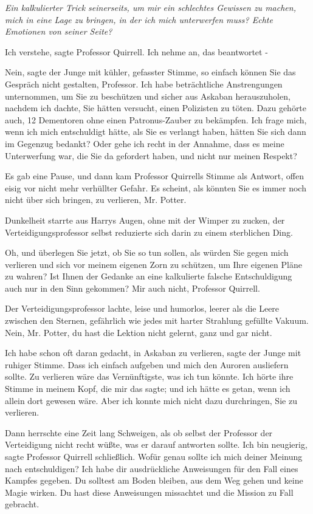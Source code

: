 \emph{Ein kalkulierter Trick seinerseits, um mir ein schlechtes Gewissen zu
machen, mich in eine Lage zu bringen, in der ich mich unterwerfen muss? Echte
Emotionen von seiner Seite?}

\glqq Ich verstehe\grqq{}, sagte Professor Quirrell. \glqq Ich nehme an, das
beantwortet -\grqq{}

\glqq Nein\grqq{}, sagte der Junge mit kühler, gefasster Stimme, \glqq so
einfach können Sie das Gespräch nicht gestalten, Professor. Ich habe
beträchtliche Anstrengungen unternommen, um Sie zu beschützen und sicher aus
Askaban herauszuholen, nachdem ich dachte, Sie hätten versucht, einen Polizisten
zu töten. Dazu gehörte auch, 12 Dementoren ohne einen Patronus-Zauber zu
bekämpfen. Ich frage mich, wenn ich mich entschuldigt hätte, als Sie es verlangt
haben, hätten Sie sich dann im Gegenzug bedankt? Oder gehe ich recht in der
Annahme, dass es meine Unterwerfung war, die Sie da gefordert haben, und nicht
nur meinen Respekt?\grqq{}

Es gab eine Pause, und dann kam Professor Quirrells Stimme als Antwort, offen
eisig vor nicht mehr verhüllter Gefahr. \glqq Es scheint, als könnten Sie es
immer noch nicht über sich bringen, zu verlieren, Mr. Potter.\grqq{}

Dunkelheit starrte aus Harrys Augen, ohne mit der Wimper zu zucken, der
Verteidigungsprofessor selbst reduzierte sich darin zu einem sterblichen Ding.

\glqq Oh, und überlegen Sie jetzt, ob Sie so tun sollen, als würden Sie gegen
mich verlieren und sich vor meinem eigenen Zorn zu schützen, um Ihre eigenen
Pläne zu wahren? Ist Ihnen der Gedanke an eine kalkulierte falsche
Entschuldigung auch nur in den Sinn gekommen? Mir auch nicht, Professor
Quirrell.\grqq{}

Der Verteidigungsprofessor lachte, leise und humorlos, leerer als die Leere
zwischen den Sternen, gefährlich wie jedes mit harter Strahlung gefüllte Vakuum.
\glqq Nein, Mr. Potter, du hast die Lektion nicht gelernt, ganz und gar
nicht.\grqq{}

\glqq Ich habe schon oft daran gedacht, in Askaban zu verlieren\grqq{}, sagte
der Junge mit ruhiger Stimme. \glqq Dass ich einfach aufgeben und mich den
Auroren ausliefern sollte. Zu verlieren wäre das Vernünftigste, was ich tun
könnte. Ich hörte ihre Stimme in meinem Kopf, die mir das sagte; und ich hätte
es getan, wenn ich allein dort gewesen wäre. Aber ich konnte mich nicht dazu
durchringen, Sie zu verlieren.\grqq{}

Dann herrschte eine Zeit lang Schweigen, als ob selbst der Professor der
Verteidigung nicht recht wüßte, was er darauf antworten sollte. \glqq Ich bin
neugierig\grqq{}, sagte Professor Quirrell schließlich. \glqq Wofür genau sollte
ich mich deiner Meinung nach entschuldigen? Ich habe dir ausdrückliche
Anweisungen für den Fall eines Kampfes gegeben. Du solltest am Boden bleiben,
aus dem Weg gehen und keine Magie wirken. Du hast diese Anweisungen missachtet
und die Mission zu Fall gebracht.\grqq{}

